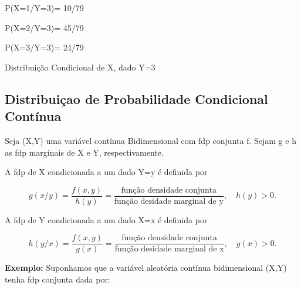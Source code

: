 \documentclass[a4paper,12pt]{report}
\begin{document}
{%


\par P(X=1/Y=3)= 10/79 \\
\par P(X=2/Y=3)= 45/79 \\
\par P(X=3/Y=3)= 24/79

\vskip0.3cm

Distribuição Condicional de X, dado Y=3

\begin{table}[!htb]
\end{table}



\subsection{Distribuiçao de Probabilidade Condicional Contínua}

Seja (X,Y) uma variável contínua Bidimensional com fdp conjunta f.
Sejam g e h as fdp marginais de X e Y, respectivamente.\vskip0.3cm


A fdp de X condicionada a um dado Y=y é definida por


\begin{equation}\label{}
    g(x/y) = \frac{f(x,y)}{h(y)}=\frac{\mbox{função densidade conjunta}}{ \mbox{função desidade marginal de
    y}}, \quad h(y)>0.
\end{equation}




A fdp de Y condicionada a um dado X=x é definida por


\begin{equation}\label{}
    h(y/x) = \frac{f(x,y)}{g(x)}=\frac{\mbox{função densidade conjunta}}{ \mbox{função desidade marginal de
    x}}, \quad g(x)>0.
\end{equation}


\textbf{Exemplo:} Suponhamos que a variável aleatória contínua
bidimensional (X,Y) tenha fdp conjunta dada por:


}
\end{document}
